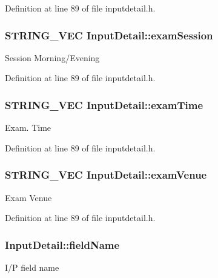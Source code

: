 Definition at line 89 of file inputdetail.\-h.

\hypertarget{classInputDetail_a4501d1379c278965497abf21d369ad9e}{
\subsubsection[{exam\-Session}]{\setlength{\rightskip}{0pt plus 5cm}S\-T\-R\-I\-N\-G\-\_\-\-V\-E\-C Input\-Detail\-::exam\-Session\hspace{0.3cm}{\ttfamily [protected]}}}\label{classInputDetail_a4501d1379c278965497abf21d369ad9e}
Session Morning/\-Evening 

Definition at line 89 of file inputdetail.\-h.

\hypertarget{classInputDetail_a847dd8bb2f0c43960746cfa4d2310a15}{
\subsubsection[{exam\-Time}]{\setlength{\rightskip}{0pt plus 5cm}S\-T\-R\-I\-N\-G\-\_\-\-V\-E\-C Input\-Detail\-::exam\-Time\hspace{0.3cm}{\ttfamily [protected]}}}\label{classInputDetail_a847dd8bb2f0c43960746cfa4d2310a15}
Exam. Time 

Definition at line 89 of file inputdetail.\-h.

\hypertarget{classInputDetail_a695928668a413ac052776c0b6cb27501}{
\subsubsection[{exam\-Venue}]{\setlength{\rightskip}{0pt plus 5cm}S\-T\-R\-I\-N\-G\-\_\-\-V\-E\-C Input\-Detail\-::exam\-Venue\hspace{0.3cm}{\ttfamily [protected]}}}\label{classInputDetail_a695928668a413ac052776c0b6cb27501}
Exam Venue 

Definition at line 89 of file inputdetail.\-h.

\hypertarget{classInputDetail_ac6f85380c5152c406d483726382c4798}{
\subsubsection[{field\-Name}]{ Input\-Detail\-::field\-Name\hspace{0.3cm}{\ttfamily [protected]}}}\label{classInputDetail_ac6f85380c5152c406d483726382c4798}
I/\-P field name 

